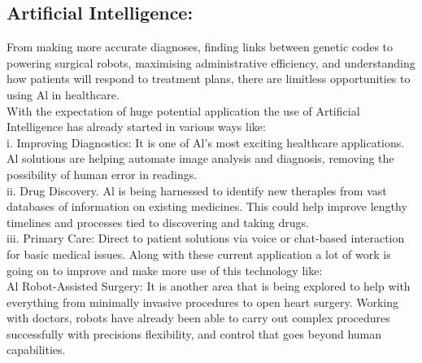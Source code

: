 \documentclass[a4paper,12pt]{article}
\begin{document}
\subsection{Artificial Intelligence:}
From making more accurate diagnoses, finding links between genetic codes to powering surgical robots, maximising administrative efficiency, and understanding how patients will respond to treatment plans, there are limitless opportunities to using Al in healthcare.
\\
With the expectation of huge potential application the use of Artificial Intelligence has already started in various ways like:
\\
i. Improving Diagnostics: It is one of Al's most exciting healthcare applications. Al solutions are helping automate image analysis and diagnosis, removing the possibility of human error in readings.
\\
ii. Drug Discovery. Al is being harnessed to identify new theraples from vast databases of information on existing medicines. This could help improve lengthy timelines and processes tied to discovering and taking drugs.
\\
iii. Primary Care: Direct to patient solutions via voice or chat-based interaction for basic medical issues. 
\clearpage
Along with these current application a lot of work is going on to improve and make more use of this technology like:
\\
Al Robot-Assisted Surgery: It is another area that is being explored to help with everything from minimally invasive procedures to open heart surgery. Working with doctors, robots have already been able to carry out complex procedures successfully with precisions flexibility, and control that goes beyond human capabilities.
\\
\end{document}
